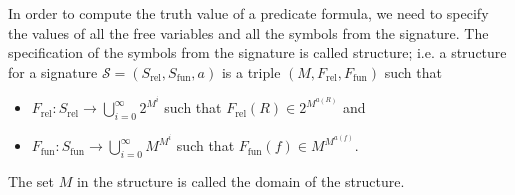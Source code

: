 In order to compute the truth value of a predicate formula, we need to specify
the values of all the free variables and all the symbols from the signature.
The specification of the symbols from the signature is called structure; i.e.
a structure for a signature $\mathcal{S} = (S_\mathrm{rel}, S_\mathrm{fun}, a)$
is a triple $(M, F_\mathrm{rel}, F_\mathrm{fun})$ such that
\begin{itemize}
  \item $F_\mathrm{rel} : S_\mathrm{rel} \to \bigcup_{i = 0}^\infty 2^{M^i}$
    such that $F_\mathrm{rel}(R) \in 2^{M^{a(R)}}$ and
  \item $F_\mathrm{fun} : S_\mathrm{fun} \to \bigcup_{i = 0}^\infty M^{M^i}$
    such that $F_\mathrm{fun}(f) \in M^{M^{a(f)}}$.
\end{itemize}
The set $M$ in the structure is called the domain of the structure.


